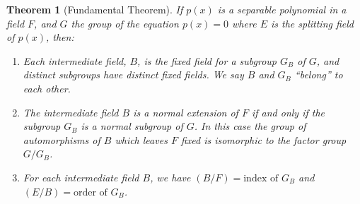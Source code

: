 \documentclass[11pt]{article}
\newtheorem{theo}{Theorem}
\theoremstyle{definition}
\begin{document}
\begin{theo}[Fundamental Theorem]
\label{theo:onsi}
If $p(x)$ is a separable polynomial in a field $F$, and $G$ the group of the equation $p(x) = 0$ where $E$ is the splitting field of $p(x)$, then:
\begin{enumerate}
\item
Each intermediate field, $B$, is the fixed field for a subgroup $G_B$ of $G$, and distinct subgroups have distinct fixed fields.
We say $B$ and $G_B$ ``belong'' to each other.

\item
The intermediate field $B$ is a normal extension of $F$ if and only if the subgroup $G_B$ is a normal subgroup of $G$.
In this case the group of automorphisms of $B$ which leaves $F$ fixed is isomorphic to the factor group $G/G_B$.

\item
For each intermediate field $B$, we have $(B/F) = \text{index of $G_B$}$ and $(E/B) = \text{order of $G_B$}$.
\end{enumerate}
\end{theo}
\end{document}

